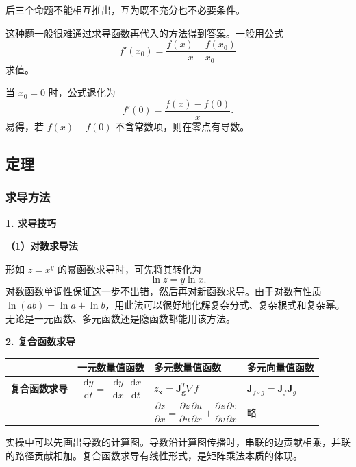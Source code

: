 \documentclass[UTF8,fontset=fandol,zihao=5]{ctexart}
\newcommand{\dd}{\mathop{}\!\mathrm{d}}
\begin{document}
后三个命题不能相互推出，互为既不充分也不必要条件。

\begin{method}[求函数在指定点处的导数]
这种题一般很难通过求导函数再代入的方法得到答案。一般用公式
\[
f'(x_0)=\frac{f(x)-f(x_0)}{x-x_0}
\]
求值。

当 $x_0=0$ 时，公式退化为
\[
f'(0)=\frac{f(x)-f(0)}{x}.
\]
易得，若 $f(x)-f(0)$ 不含常数项，则在零点有导数。
\end{method}

\subsection{定理}

\subsubsection{求导方法}

\textbf{1. 求导技巧}

\textbf{（1）对数求导法}

形如 $z=x^y$ 的幂函数求导时，可先将其转化为
\[
\ln z=y\ln x.
\]
对数函数单调性保证这一步不出错，然后再对新函数求导。由于对数有性质 $\ln(ab)=\ln a+\ln b$，用此法可以很好地化解复杂分式、复杂根式和复杂幂。无论是一元函数、多元函数还是隐函数都能用该方法。

\textbf{2. 复合函数求导}

\begin{center}
\begin{tabularx}{\textwidth}{>{\bfseries}p{2.5cm}XXX}
\toprule
 & 一元数量值函数 & 多元数量值函数 & 多元向量值函数 \\
\midrule
复合函数求导 &
$\dfrac{\dd y}{\dd t}=\dfrac{\dd y}{\dd x}\dfrac{\dd x}{\dd t}$ &
$z_{\bm x}=\bm J_{\bm g}^{T}\nabla f$ &
$\bm J_{f\circ g}=\bm J_f\bm J_g$ \\
 & &
$\dfrac{\partial z}{\partial x}=\dfrac{\partial z}{\partial u}\dfrac{\partial u}{\partial x}+\dfrac{\partial z}{\partial v}\dfrac{\partial v}{\partial x}$ & 略 \\
\bottomrule
\end{tabularx}
\end{center}

实操中可以先画出导数的计算图。导数沿计算图传播时，串联的边贡献相乘，并联的路径贡献相加。复合函数求导有线性形式，是矩阵乘法本质的体现。

\begin{center}
\end{center}
\end{document}

